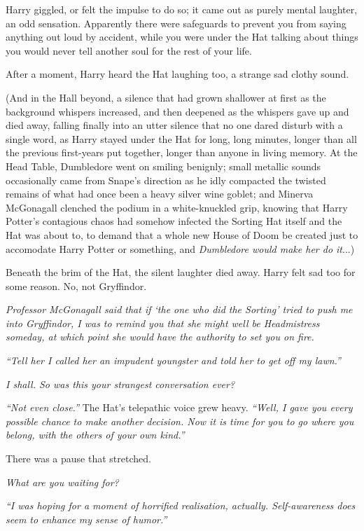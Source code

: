 Harry giggled, or felt the impulse to do so; it came out as purely mental laughter, an odd sensation. Apparently there were safeguards to prevent you from saying anything out loud by accident, while you were under the Hat talking about things you would never tell another soul for the rest of your life.

After a moment, Harry heard the Hat laughing too, a strange sad clothy sound.

(And in the Hall beyond, a silence that had grown shallower at first as the background whispers increased, and then deepened as the whispers gave up and died away, falling finally into an utter silence that no one dared disturb with a single word, as Harry stayed under the Hat for long, long minutes, longer than all the previous first-years put together, longer than anyone in living memory. At the Head Table, Dumbledore went on smiling benignly; small metallic sounds occasionally came from Snape's direction as he idly compacted the twisted remains of what had once been a heavy silver wine goblet; and Minerva McGonagall clenched the podium in a white-knuckled grip, knowing that Harry Potter's contagious chaos had somehow infected the Sorting Hat itself and the Hat was about to, to demand that a whole new House of Doom be created just to accomodate Harry Potter or something, and \emph{Dumbledore would make her do it}...)

Beneath the brim of the Hat, the silent laughter died away. Harry felt sad too for some reason. No, not Gryffindor.

\emph{Professor McGonagall said that if `the one who did the Sorting' tried to push me into Gryffindor, I was to remind you that she might well be Headmistress someday, at which point she would have the authority to set you on fire.}

\emph{``Tell her I called her an impudent youngster and told her to get off my lawn.''}

\emph{I shall. So was this your strangest conversation ever?}

\emph{``Not even close.''} The Hat's telepathic voice grew heavy. \emph{``Well, I gave you every possible chance to make another decision. Now it is time for you to go where you belong, with the others of your own kind.''}

There was a pause that stretched.

\emph{What are you waiting for?}

\emph{``I was hoping for a moment of horrified realisation, actually. Self-awareness does seem to enhance my sense of humor.''}

